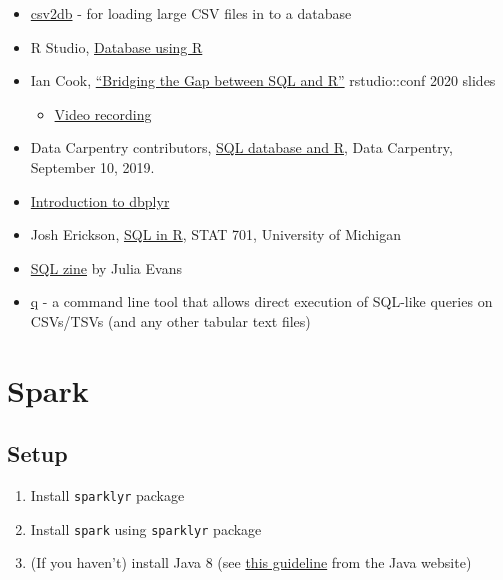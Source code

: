 \documentclass[
]{book}
\providecommand{\tightlist}{%
  \setlength{\itemsep}{0pt}\setlength{\parskip}{0pt}}
\begin{document}
\begin{itemize}
\tightlist
\item
  \href{https://github.com/csv2db/csv2db}{csv2db} - for loading large CSV files in to a database
\item
  R Studio, \href{https://db.rstudio.com/}{Database using R}
\item
  Ian Cook, \href{https://github.com/ianmcook/rstudioconf2020/blob/master/bridging_the_gap_between_sql_and_r.pdf}{``Bridging the Gap between SQL and R''} rstudio::conf 2020 slides

  \begin{itemize}
  \tightlist
  \item
    \href{https://www.youtube.com/watch?v=JwP5KdWSgqE\&ab_channel=RStudio}{Video recording}
  \end{itemize}
\item
  Data Carpentry contributors, \href{https://datacarpentry.org/R-ecology-lesson/05-r-and-databases.html}{SQL database and R}, Data Carpentry, September 10, 2019.
\item
  \href{https://cran.r-project.org/web/packages/dbplyr/vignettes/dbplyr.html}{Introduction to dbplyr}
\item
  Josh Erickson, \href{http://dept.stat.lsa.umich.edu/~jerrick/courses/stat701/notes/sql.html}{SQL in R}, STAT 701, University of Michigan
\item
  \href{https://wizardzines.com/zines/sql/}{SQL zine} by Julia Evans
\item
  \href{http://harelba.github.io/q/}{q} - a command line tool that allows direct execution of SQL-like queries on CSVs/TSVs (and any other tabular text files)
\end{itemize}

\hypertarget{spark}{%
\section{Spark}\label{spark}}

\hypertarget{setup-8}{%
\subsection{Setup}\label{setup-8}}

\begin{enumerate}
\def\labelenumi{\arabic{enumi}.}
\tightlist
\item
  Install \texttt{sparklyr} package
\item
  Install \texttt{spark} using \texttt{sparklyr} package
\item
  (If you haven't) install Java 8 (see \href{https://www.java.com/en/download/manual.jsp}{this guideline} from the Java website)
\end{enumerate}
\end{document}
